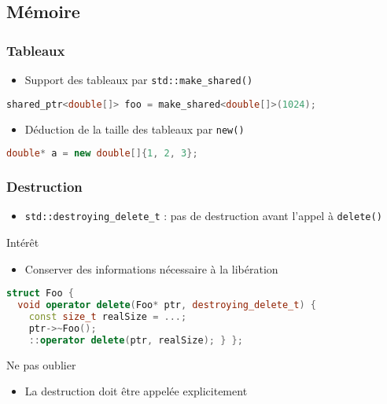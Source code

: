 \documentclass[C++.tex]{subfiles}
\begin{document}
\subsection*{Mémoire}
\begin{frame}[fragile]
	\frametitle{Tableaux}
	\begin{itemize}
		\item Support des tableaux par \lstinline|std::make_shared()|
	\end{itemize}

	\begin{lstlisting}[language=C++]
shared_ptr<double[]> foo = make_shared<double[]>(1024);\end{lstlisting}

	\begin{itemize}
		\item Déduction de la taille des tableaux par \lstinline|new()|
	\end{itemize}

	\begin{lstlisting}[language=C++]
double* a = new double[]{1, 2, 3};\end{lstlisting}
\end{frame}

\begin{frame}[fragile]
	\frametitle{Destruction}
	\begin{itemize}
		\item \lstinline|std::destroying_delete_t| : pas de destruction avant l'appel à \lstinline|delete()|
	\end{itemize}

	\begin{block}{Intérêt}
		\begin{itemize}
			\item Conserver des informations nécessaire à la libération
		\end{itemize}
	\end{block}

	\begin{lstlisting}[language=C++]
struct Foo {
  void operator delete(Foo* ptr, destroying_delete_t) {
    const size_t realSize = ...;
    ptr->~Foo();
    ::operator delete(ptr, realSize); } };\end{lstlisting}

	\begin{alertblock}{Ne pas oublier}
		\begin{itemize}
			\item La destruction doit être appelée explicitement
		\end{itemize}
	\end{alertblock}
\end{frame}
\end{document}
